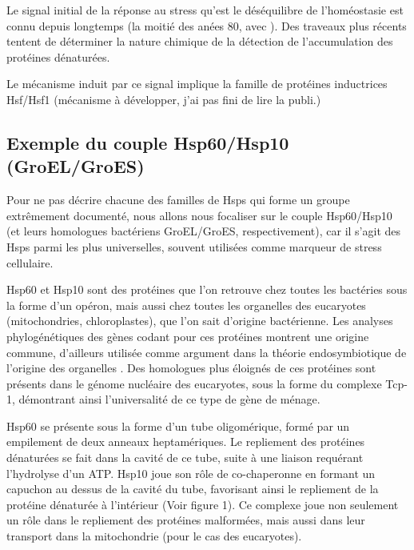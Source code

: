 Le signal initial de la réponse au stress qu'est le déséquilibre de l'homéostasie est connu depuis longtemps (la moitié des anées 80, avec \cite{ananthan1986}).
Des traveaux plus récents tentent de déterminer la nature chimique de la détection de l'accumulation des protéines dénaturées.

Le mécanisme induit par ce signal implique la famille de protéines inductrices Hsf/Hsf1 \cite{voellmy2004} (mécanisme à développer, j'ai pas fini de lire la publi.)



\subsection{Exemple du couple Hsp60/Hsp10 (GroEL/GroES)}

Pour ne pas décrire chacune des familles de Hsps qui forme un groupe extrêmement documenté, nous allons nous focaliser sur le couple Hsp60/Hsp10 (et leurs homologues bactériens GroEL/GroES, respectivement), car il s'agit des Hsps parmi les plus universelles, souvent utilisées comme marqueur de stress cellulaire.

Hsp60 et Hsp10 sont des protéines que l'on retrouve chez toutes les bactéries sous la forme d'un opéron, mais aussi chez toutes les organelles des eucaryotes (mitochondries, chloroplastes), que l'on sait d'origine bactérienne.
Les analyses phylogénétiques des gènes codant pour ces protéines montrent une origine commune, d'ailleurs utilisée comme argument dans la théorie endosymbiotique de l'origine des organelles \cite{gupta1995}.
Des homologues plus éloignés de ces protéines sont présents dans le génome nucléaire des eucaryotes, sous la forme du complexe Tcp-1, démontrant ainsi l'universalité de ce type de gène de ménage.


Hsp60 se présente sous la forme d'un tube oligomérique, formé par un empilement de deux anneaux heptamériques.
Le repliement des protéines dénaturées se fait dans la cavité de ce tube, suite à une liaison requérant l'hydrolyse d'un ATP.
Hsp10 joue son rôle de co-chaperonne en formant un capuchon au dessus de la cavité du tube, favorisant ainsi le repliement de la protéine dénaturée à l'intérieur (Voir figure 1).
Ce complexe joue non seulement un rôle dans le repliement des protéines malformées, mais aussi dans leur transport dans la mitochondrie (pour le cas des eucaryotes).




